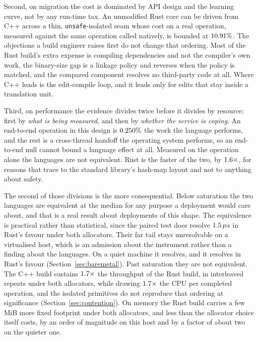 \documentclass[english,oneside,a4paper,censored,csm,software-track-2020]{HYthesisML}
\begin{document}
Second, on migration
the cost is dominated by API design and the learning curve, not by any run-time tax. An
unmodified Rust core can be driven from C++ across a thin, \texttt{unsafe}-isolated seam whose
cost on a real operation, measured against the same operation called natively, is bounded at
$10.91\%$. The objections a build engineer raises first do not change that ordering.
Most of the Rust build's extra expense is compiling dependencies and not the compiler's own work,
the binary-size gap is a linkage policy and reverses when the policy is matched, and the compared
component resolves no third-party code at all. Where C++ leads is the edit-compile loop, and it
leads only for edits that stay inside a translation unit.

Third, on performance the evidence divides twice before it divides by resource: first by
\emph{what is being measured}, and then by \emph{whether the service is coping}. An end-to-end
operation in this design is $0.250\%$ the work the
language performs, and the rest is a cross-thread handoff the operating system performs, so an
end-to-end null cannot bound a language effect at all. Measured on the operation alone the
languages are not equivalent. Rust is the faster of the two, by $1.6\times$, for
reasons that trace to the standard library's hash-map layout and not to anything about safety.

The second of those divisions is the more consequential. Below saturation the two
languages are equivalent at the median for any purpose a deployment would care about, and that is a
real result about deployments of this shape. The equivalence is practical rather than statistical,
since the paired test does resolve $1.5\,\mu$s in Rust's favour under both
allocators. Their far tail stays unresolvable on a virtualised host, which is an admission about the
instrument rather than a finding about the languages. On a quiet machine it resolves, and it
resolves in Rust's favour (Section~\ref{sec:baremetal}). Past saturation they are not equivalent. The C++ build sustains
$1.7\times$ the throughput of the Rust build, in \OverloadThrAgree{} interleaved
repeats under both allocators, while drawing $1.7\times$ the CPU per completed
operation, and the isolated primitives do not reproduce that ordering at significance
(Section~\ref{sec:contention}). On memory the Rust build carries a few MiB more fixed footprint
under both allocators, and less than the allocator choice itself costs, by an order of magnitude on
this host and by a factor of about two on the quieter one.
\end{document}
